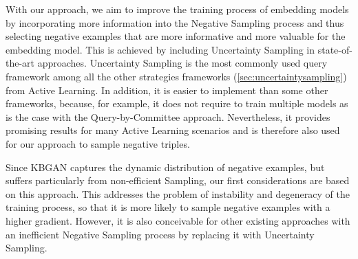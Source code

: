 With our approach, we aim to improve the training process of embedding models by incorporating more information into the Negative Sampling process and thus selecting negative examples that are more informative and more valuable for the embedding model.
This is achieved by including Uncertainty Sampling in state-of-the-art approaches.
Uncertainty Sampling is the most commonly used query framework among all the other strategies frameworks (\autoref{sec:uncertaintysampling}) from Active Learning.
In addition, it is easier to implement than some other frameworks, because, for example, it does not require to train multiple models as is the case with the Query-by-Committee approach.
Nevertheless, it provides promising results for many Active Learning scenarios and is therefore also used for our approach to sample negative triples.

Since \ac{KBGAN} captures the dynamic distribution of negative examples, but suffers particularly from non-efficient Sampling, our first considerations are based on this approach.
This addresses the problem of instability and degeneracy of the training process, so that it is more likely to sample negative examples with a higher gradient.
However, it is also conceivable for other existing approaches with an inefficient Negative Sampling process by replacing it with Uncertainty Sampling.

